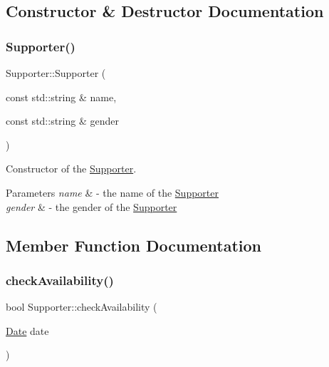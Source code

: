 \subsection{Constructor \& Destructor Documentation}
\mbox{\label{class_supporter_a930a75166ab9e6104c9a55d025289168}} 
\subsubsection{\texorpdfstring{Supporter()}{Supporter()}}
{\footnotesize\ttfamily Supporter\+::\+Supporter (\begin{DoxyParamCaption}\item[{const std\+::string \&}]{name,  }\item[{const std\+::string \&}]{gender }\end{DoxyParamCaption})}



Constructor of the \mbox{\hyperlink{class_supporter}{Supporter}}. 


\begin{DoxyParams}{Parameters}
{\em name} & -\/ the name of the \mbox{\hyperlink{class_supporter}{Supporter}} \\
\hline
{\em gender} & -\/ the gender of the \mbox{\hyperlink{class_supporter}{Supporter}} \\
\hline
\end{DoxyParams}


\subsection{Member Function Documentation}
\mbox{\label{class_supporter_abc9023e59feac7f460aac0d182d3175d}} 
\subsubsection{\texorpdfstring{check\+Availability()}{checkAvailability()}}
{\footnotesize\ttfamily bool Supporter\+::check\+Availability (\begin{DoxyParamCaption}\item[{\mbox{\hyperlink{class_date}{Date}}}]{date }\end{DoxyParamCaption})}



